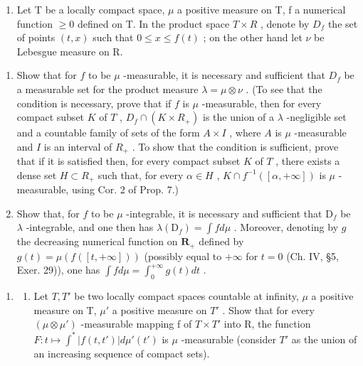 \begin{enumerate}
\def\labelenumi{\arabic{enumi})}
\setcounter{enumi}{2}
\tightlist
\item
  Let T be a locally compact space, \(\mu\) a positive measure on T, f a numerical function \(\geqslant 0\) defined on T. In the product space \(T \times R\) , denote by \(D_{f}\) the set of points \((t, x)\) such that \(0 \leqslant x \leqslant f(t)\) ; on the other hand let \(\nu\) be Lebesgue measure on R.
\end{enumerate}

\begin{enumerate}
\def\labelenumi{\alph{enumi})}
\item
  Show that for \(f\) to be \(\mu\) -measurable, it is necessary and sufficient that \(D_f\) be a measurable set for the product measure \(\lambda = \mu \otimes \nu\) . (To see that the condition is necessary, prove that if \(f\) is \(\mu\) -measurable, then for every compact subset \(K\) of \(T\) , \(D_f \cap (K \times R_+)\) is the union of a \(\lambda\) -negligible set and a countable family of sets of the form \(A \times I\) , where \(A\) is \(\mu\) -measurable and \(I\) is an interval of \(R_+\) . To show that the condition is sufficient, prove that if it is satisfied then, for every compact subset \(K\) of \(T\) , there exists a dense set \(H \subset R_+\) such that, for every \(\alpha \in H\) , \(K \cap f^{-1}([\alpha, +\infty])\) is \(\mu\) -measurable, using Cor. 2 of Prop. 7.)
\item
  Show that, for \(f\) to be \(\mu\) -integrable, it is necessary and sufficient that \(\mathrm{D}_f\) be \(\lambda\) -integrable, and one then has \(\lambda(\mathrm{D}_f) = \int f d\mu\) . Moreover, denoting by \(g\) the decreasing numerical function on \(\mathbf{R}_+\) defined by \(g(t) = \mu\left( f([t, +\infty]) \right)\) (possibly equal to \(+\infty\) for \(t = 0\) (Ch. IV, §5, Exer. 29)), one has \(\int f d\mu = \int_0^{+\infty} g(t) dt\) .
\end{enumerate}

\begin{enumerate}
\def\labelenumi{\arabic{enumi})}
\setcounter{enumi}{3}
\tightlist
\item
  \begin{enumerate}
  \def\labelenumii{\alph{enumii})}
  \tightlist
  \item
    Let \(T, T'\) be two locally compact spaces countable at infinity, \(\mu\) a positive measure on T, \(\mu'\) a positive measure on \(T'\) . Show that for every \((\mu \otimes \mu')\) -measurable mapping f of \(T \times T'\) into R, the function \(F : t \mapsto \int^{*} |f(t, t')| d\mu'(t')\) is \(\mu\) -measurable (consider \(T'\) as the union of an increasing sequence of compact sets).
  \end{enumerate}
\end{enumerate}

